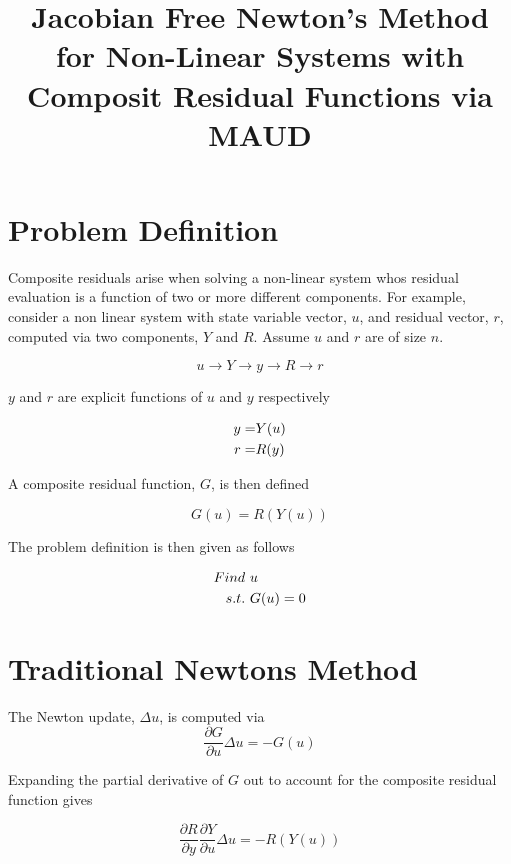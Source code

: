 \documentclass[12pt]{article}
\title {Jacobian Free Newton's Method for Non-Linear Systems with Composit Residual Functions via MAUD}
\begin{document}
\maketitle

\section{Problem Definition}

Composite residuals arise when solving a non-linear system whos residual evaluation is a function of two
or more different components. For example, consider a non linear system with state variable vector, $u$, and
residual vector, $r$, computed via two components, $Y$ and $R$. Assume $u$ and $r$ are of size $n$.

\begin{equation}
  u \longrightarrow Y \longrightarrow y \longrightarrow R \longrightarrow r
\end{equation}

$y$ and $r$ are explicit functions of $u$ and $y$ respectively

\begin{align}
  y = & Y(u) \notag \\
  r = & R(y)
\end{align}

A composite residual function, $G$, is then defined

\begin{equation}
  G(u) = R(Y(u))
\end{equation}

The problem definition is then given as follows

\begin{align}
  Find &\  u \notag \\
  s.t. &\  G(u) = 0
\end{align}

\section{Traditional Newtons Method}

The Newton update, $\Delta u$, is computed via
\begin{equation}
  \frac{\partial G}{\partial u} \Delta u = -G(u)
\end{equation}

Expanding the partial derivative of $G$ out to account for the composite residual function
gives

\begin{equation}
  \frac{\partial R}{\partial y}  \frac{\partial Y}{\partial u} \Delta u = -R\left(Y(u)\right)
  \label{expanded_newton_iter}
\end{equation}
\end{document}

